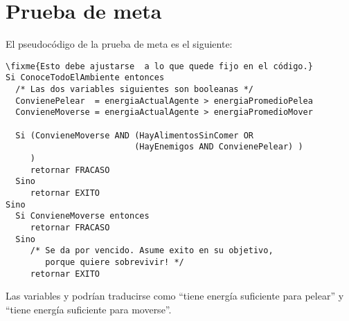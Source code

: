 ﻿\section{Prueba de meta}

El pseudocódigo de la prueba de meta es el siguiente:

\begin{verbatim}
\fixme{Esto debe ajustarse  a lo que quede fijo en el código.}
Si ConoceTodoElAmbiente entonces
  /* Las dos variables siguientes son booleanas */
  ConvienePelear  = energiaActualAgente > energiaPromedioPelea
  ConvieneMoverse = energiaActualAgente > energiaPromedioMover

  Si (ConvieneMoverse AND (HayAlimentosSinComer OR 
                          (HayEnemigos AND ConvienePelear) )
     )  
     retornar FRACASO
  Sino
     retornar EXITO
Sino
  Si ConvieneMoverse entonces
     retornar FRACASO  
  Sino
     /* Se da por vencido. Asume exito en su objetivo,
        porque quiere sobrevivir! */
     retornar EXITO

\end{verbatim}

Las variables  y  podrían
traducirse como ``tiene energía suficiente para pelear'' y ``tiene energía
suficiente para moverse''.

